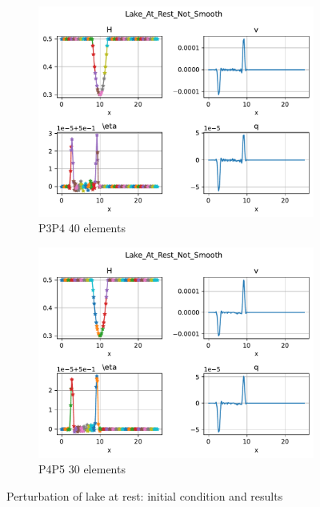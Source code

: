 \documentclass[english]{article}
\theoremstyle{thmstyleone}
\theoremstyle{thmstyletwo}
\theoremstyle{thmstylethree}
\begin{document}
\begin{figure}
\begin{subfigure}{0.45\textwidth}
		\includegraphics[trim= 0 0 200 180, clip,width=\textwidth]{figures/LatRnS_P3P4_N_el00040.pdf}\caption{P3P4 40 elements}
	\end{subfigure}
	\begin{subfigure}{0.45\textwidth}
		\includegraphics[trim= 0 0 200 180, clip,width=\textwidth]{figures/LatRnS_P4P5_N_el00030.pdf}\caption{P4P5 30 elements}
	\end{subfigure}
	\caption{Perturbation of lake at rest: initial condition and results}\label{fig:LatR_perturbation}
\end{figure}
\end{document}
